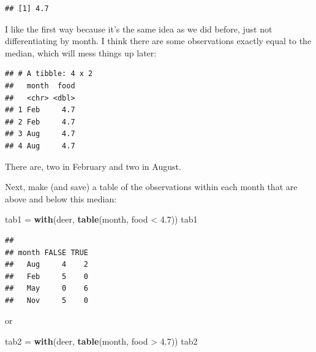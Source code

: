 \documentclass[]{tufte-book}
\newenvironment{Shaded}{}{}
\newcommand{\FloatTok}[1]{\textcolor[rgb]{0.25,0.63,0.44}{#1}}
\newcommand{\KeywordTok}[1]{\textcolor[rgb]{0.00,0.44,0.13}{\textbf{#1}}}
\newcommand{\NormalTok}[1]{#1}
\newcommand{\OperatorTok}[1]{\textcolor[rgb]{0.40,0.40,0.40}{#1}}
\newcommand{\StringTok}[1]{\textcolor[rgb]{0.25,0.44,0.63}{#1}}
\theoremstyle{definition}
\theoremstyle{definition}
\theoremstyle{definition}
\theoremstyle{remark}
\begin{document}
\begin{Shaded}
\end{Shaded}

\begin{verbatim}
## [1] 4.7
\end{verbatim}

I like the first way because it's the same idea as we did before, just
not differentiating by month. I think there are some observations
exactly equal to the median, which will mess things up later:

\begin{Shaded}
\end{Shaded}

\begin{verbatim}
## # A tibble: 4 x 2
##   month  food
##   <chr> <dbl>
## 1 Feb     4.7
## 2 Feb     4.7
## 3 Aug     4.7
## 4 Aug     4.7
\end{verbatim}

There are, two in February and two in August.

Next, make (and save) a table of the observations within each month that
are above and below this median:

\begin{Shaded}
\begin{Highlighting}[]
\NormalTok{tab1 =}\StringTok{ }\KeywordTok{with}\NormalTok{(deer, }\KeywordTok{table}\NormalTok{(month, food }\OperatorTok{<}\StringTok{ }\FloatTok{4.7}\NormalTok{))}
\NormalTok{tab1}
\end{Highlighting}
\end{Shaded}

\begin{verbatim}
##      
## month FALSE TRUE
##   Aug     4    2
##   Feb     5    0
##   May     0    6
##   Nov     5    0
\end{verbatim}

or

\begin{Shaded}
\begin{Highlighting}[]
\NormalTok{tab2 =}\StringTok{ }\KeywordTok{with}\NormalTok{(deer, }\KeywordTok{table}\NormalTok{(month, food }\OperatorTok{>}\StringTok{ }\FloatTok{4.7}\NormalTok{))}
\NormalTok{tab2}
\end{Highlighting}
\end{Shaded}
\end{document}
